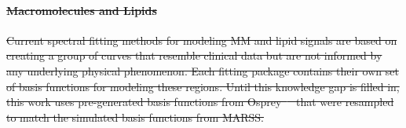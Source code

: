 \documentclass[AMA,LATO1COL]{WileyNJD-v2}
\providecommand{\DIFdel}[1]{{\protect\color{red}\sout{#1}}}                      %
\providecommand{\DIFdelbegin}{} %
\providecommand{\DIFdelend}{} %
\begin{document}
 
\DIFdelbegin \paragraph{\DIFdel{Macromolecules and Lipids}}
\addtocounter{paragraph}{-1}%
\DIFdel{Current spectral fitting methods for modeling MM and lipid signals are based on creating a group of curves that resemble clinical data but are not informed by any underlying physical phenomenon. Each fitting package contains their own set of basis functions for modeling these regions. Until this knowledge gap is filled in, this work uses pre-generated basis functions from Osprey\mbox{%
\cite{Oeltzschner2020} }\hspace{0pt}%
that were resampled to match the simulated basis functions from MARSS.
 }\DIFdelend %
\end{document}

